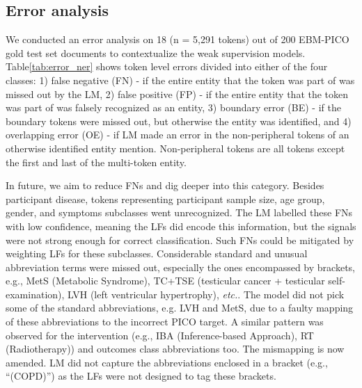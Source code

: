 \documentclass[10.7pt,]{article}
\begin{document}
\subsection{Error analysis}\label{error_an}
%
We conducted an error analysis on 18 (n = 5,291 tokens) out of 200 EBM-PICO gold test set documents to contextualize the weak supervision models.
Table\ref{tab:error_ner} shows token level errors divided into either of the four classes: 1) false negative (FN) - if the entire entity that the token was part of was missed out by the LM, 2) false positive (FP) - if the entire entity that the token was part of was falsely recognized as an entity, 3) boundary error (BE) - if the boundary tokens were missed out, but otherwise the entity was identified, and 4) overlapping error (OE) - if LM made an error in the non-peripheral tokens of an otherwise identified entity mention.
Non-peripheral tokens are all tokens except the first and last of the multi-token entity.

In future, we aim to reduce FNs and dig deeper into this category.
Besides participant disease, tokens representing participant sample size, age group, gender, and symptoms subclasses went unrecognized.
The LM labelled these FNs with low confidence, meaning the LFs did encode this information, but the signals were not strong enough for correct classification. 
Such FNs could be mitigated by weighting LFs for these subclasses.
Considerable standard and unusual abbreviation terms were missed out, especially the ones encompassed by brackets, e.g., MetS (Metabolic Syndrome), TC+TSE (testicular cancer + testicular self-examination), LVH (left ventricular hypertrophy), \textit{etc.}.
The model did not pick some of the standard abbreviations, e.g. LVH and MetS, due to a faulty mapping of these abbreviations to the incorrect PICO target.
A similar pattern was observed for the intervention (e.g., IBA (Inference-based Approach), RT (Radiotherapy)) and outcomes class abbreviations too.
The mismapping is now amended.
LM did not capture the abbreviations enclosed in a bracket (e.g., ``(COPD)'') as the LFs were not designed to tag these brackets.
\end{document}
